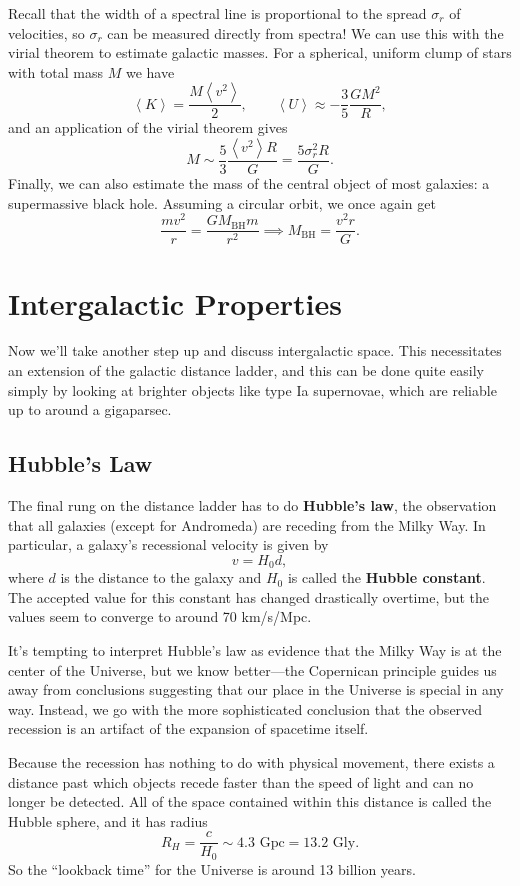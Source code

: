 \documentclass[../a062main.tex]{subfiles}
\begin{document}
Recall that the width of a spectral line is proportional to the spread $\sigma_r$ of velocities, so $\sigma_r$ can be measured directly from spectra!
We can use this with the virial theorem to estimate galactic masses.
For a spherical, uniform clump of stars with total mass $M$ we have
\[ \left< K \right> = \frac{M \left< v^2 \right>}{2}, \qquad \left< U \right> \approx -\frac{3}{5} \frac{GM^2}{R}, \]
and an application of the virial theorem gives
\[ M \sim \frac{5}{3} \frac{\left< v^2 \right> R}{G} = \frac{5 \sigma_r^2 R}{G}. \]
Finally, we can also estimate the mass of the central object of most galaxies: a supermassive black hole.
Assuming a circular orbit, we once again get
\[ \frac{mv^2}{r} = \frac{GM_\textrm{BH} m}{r^2} \implies M_\textrm{BH} = \frac{v^2 r}{G}. \]

\section{Intergalactic Properties}
Now we'll take another step up and discuss intergalactic space.
This necessitates an extension of the galactic distance ladder, and this can be done quite easily simply by looking at brighter objects like type Ia supernovae, which are reliable up to around a gigaparsec.

\subsection*{Hubble's Law}
The final rung on the distance ladder has to do \textbf{Hubble's law}, the observation that all galaxies (except for Andromeda) are receding from the Milky Way.
In particular, a galaxy's recessional velocity is given by
\[ \boxed{v = H_0 d}, \]
where $d$ is the distance to the galaxy and $H_0$ is called the \textbf{Hubble constant}.
The accepted value for this constant has changed drastically overtime, but the values seem to converge to around 70 km/s/Mpc.

It's tempting to interpret Hubble's law as evidence that the Milky Way is at the center of the Universe, but we know better---the Copernican principle guides us away from conclusions suggesting that our place in the Universe is special in any way.
Instead, we go with the more sophisticated conclusion that the observed recession is an artifact of the expansion of spacetime itself.

Because the recession has nothing to do with physical movement, there exists a distance past which objects recede faster than the speed of light and can no longer be detected.
All of the space contained within this distance is called the Hubble sphere, and it has radius
\[ R_H = \frac{c}{H_0} \sim 4.3 \textrm{ Gpc} = 13.2 \textrm{ Gly}. \]
So the ``lookback time'' for the Universe is around 13 billion years.
\end{document}
